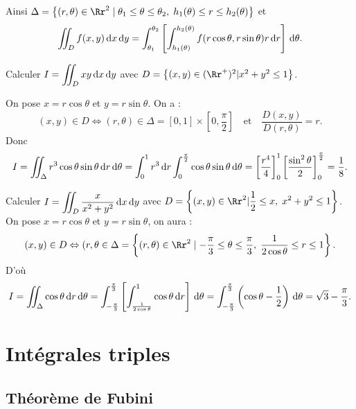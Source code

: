 \documentclass[class=report,crop=false]{standalone}
\begin{document}
\vskip4mm

\noindent Ainsi $\displaystyle \Delta =\left\{(r,\theta )\in \Rr^2\mid \theta _1\leq \theta \leq \theta _2,\; h_1(\theta )\leq r\leq h_2(\theta)\right\}$ et
$$\int \!\!\!\!\int _Df(x,y)\,\mathrm{d} x\,\mathrm{d} y=\int _{\theta _1}^{\theta _2}\left[\int _{h_1(\theta)}^{h_2(\theta)}f(r\cos \theta,r\sin \theta)r\,\mathrm{d} r\right]\,\mathrm{d} \theta.$$

\vskip6mm

Calculer $\displaystyle I=\int \!\!\!\!\int _Dxy\,\mathrm{d} x\,\mathrm{d} y$ avec $D=\left\{(x,y)\in (\Rr^+)^2|x^2+y^2\leq 1\right\}$.

\vskip2mm

\noindent On pose $x=r\cos \theta $ et $y=r\sin \theta $. On a :
$$(x,y)\in D\Leftrightarrow (r,\theta )\in \Delta =[0,1]\times \left[0,\frac{\pi}{2}\right]\quad \mbox{et}\quad \frac{D(x,y)}{D(r,\theta)}=r.$$
Donc
$$I=\int \!\!\!\!\int _{\Delta}r^3\cos \theta \sin \theta \,\mathrm{d} r\,\mathrm{d} \theta =\int _0^1r^3\,\mathrm{d} r\int _0^{\frac{\pi}{2}}\cos \theta \sin \theta \,\mathrm{d} \theta =\left[\frac{r^4}{4}\right]_0^1\left[\frac{\sin ^2\theta }{2}\right]_0^{\frac{\pi}{2}}=\frac{1}{8}.$$

\vskip4mm

Calculer $\displaystyle I=\int \!\!\!\!\int _D\frac{x}{x^2+y^2}\,\mathrm{d} x\,\mathrm{d} y$ avec $\displaystyle D=\left\{(x,y)\in \Rr^ 2|\frac{1}{2}\leq x,\; x^2+y^2\leq 1\right\}$. On pose $x=r\cos \theta $ et $y=r\sin \theta $, on aura :
$$(x,y)\in D\Leftrightarrow (r,\theta \in \Delta =\left\{(r,\theta )\in \Rr^2\mid -\frac{\pi}{3}\leq \theta \leq \frac{\pi}{3},\; \frac{1}{2\cos \theta}\leq r\leq 1\right\}.$$
D'o\`u
$$I=\int \!\!\!\!\int _{\Delta}\cos \theta \,\mathrm{d} r\,\mathrm{d} \theta=\int _{-\frac{\pi}{3}}^{\frac{\pi}{3}}\left[\int _{\frac{1}{2\cos \theta}}^1\cos \theta \,\mathrm{d} r\right]\,\mathrm{d} \theta =\int _{-\frac{\pi}{3}}^{\frac{\pi}{3}}\left(\cos \theta -\frac{1}{2}\right)\,\mathrm{d} \theta =\sqrt{3}-\frac{\pi}{3}.$$

\vskip8mm

\section{\bf Intégrales triples}
\subsection{Théorème de Fubini}

\vskip4mm
\end{document}
